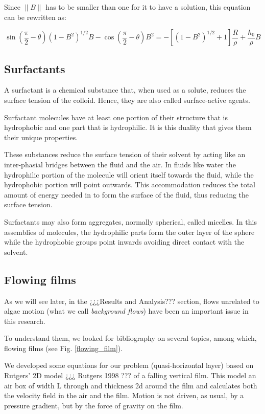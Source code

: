 Since $\|B\|$ has to be smaller than one for it to have a solution, this equation can be rewritten as:

\begin{equation}
\sin \left(\frac{\pi}{2} - \theta \right) (1 - B^2)^{1/2} B - \cos \left(\frac{\pi}{2} - \theta\right) B^2 = - [(1 - B^2)^{1/2}+1] \frac{R}{\rho} + \frac{h_0}{\rho} B
\end{equation}

\subsection{Surfactants}

A surfactant is a chemical substance that, when used as a solute, reduces the surface tension of the colloid. Hence, they are also called surface-active agents.
 
Surfactant molecules have at least one portion of their structure that is hydrophobic and one part that is hydrophilic. It is this duality that gives them their unique properties.
 
These substances reduce the surface tension of their solvent by acting like an inter-phasial bridges between the fluid and the air. In fluids like water the hydrophilic portion of the molecule will orient itself towards the fluid, while the hydrophobic portion will point outwards. This accommodation reduces the total amount of energy needed in to form the surface of the fluid, thus reducing the surface tension.
 
Surfactants may also form aggregates, normally spherical, called micelles. In this assemblies of molecules, the hydrophilic parts form the outer layer of the sphere while the hydrophobic groups point inwards avoiding direct contact with the solvent.

\subsection{Flowing films}

As we will see later, in the ¿¿¿Results and Analysis??? section, flows unrelated to algae motion (what we call \textit{background flows}) have been an important issue in this research.

To understand them, we looked for bibliography on several topics, among which, flowing films (see Fig. \ref{flowing_film}).

We developed some equations for our problem (quasi-horizontal layer) based on Rutgers' 2D model ¿¿¿ Rutgers 1998 ??? of a falling vertical film. This model an air box of width L through and thickness 2d around the film and calculates both the velocity field in the air and the film. Motion is not driven, as usual, by a pressure gradient, but by the force of gravity on the film.

